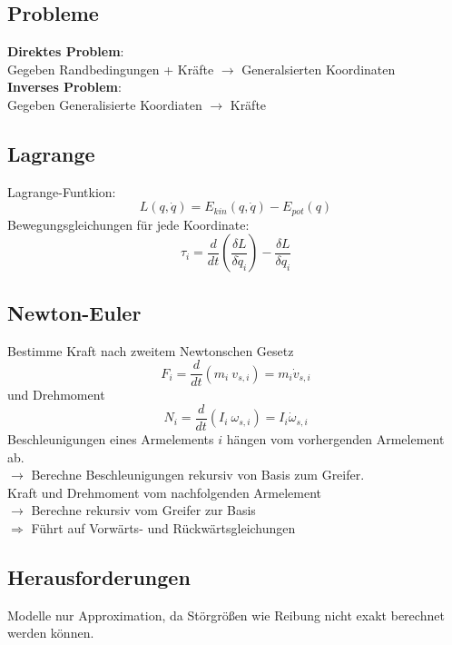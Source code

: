 \subsection{Probleme}
\textbf{Direktes Problem}:\\
Gegeben Randbedingungen + Kräfte \(\rightarrow\) Generalsierten Koordinaten\\

\textbf{Inverses Problem}:\\
Gegeben Generalisierte Koordiaten \(\rightarrow\) Kräfte


\subsection{Lagrange}
Lagrange-Funtkion:
\[ L(q, \dot{q}) = E_{\mathit{kin}}(q, \dot{q}) - E_{\mathit{pot}}(q) \]
Bewegungsgleichungen für jede Koordinate:
\[\tau_i = \frac{d}{dt} \left(\frac{\delta L}{\delta \dot{q}_i}\right) - \frac{\delta L}{\delta q_i}\]

\subsection{Newton-Euler}
Bestimme Kraft nach zweitem Newtonschen Gesetz
\[F_i = \frac{d}{dt} (m_i\ v_{s,i}) = m_i \dot{v}_{s,i}\]
und Drehmoment
\[N_i = \frac{d}{dt}(I_i\ \omega_{s,i}) = I_i \dot{\omega}_{s, i}\]
Beschleunigungen eines Armelements \(i\) hängen vom vorhergenden Armelement ab.\\
\(\rightarrow\) Berechne Beschleunigungen rekursiv von Basis zum Greifer.\\
Kraft und Drehmoment vom nachfolgenden Armelement\\
\(\rightarrow\) Berechne rekursiv vom Greifer zur Basis\\

\(\Rightarrow\) Führt auf Vorwärts- und Rückwärtsgleichungen


\subsection{Herausforderungen}
Modelle nur Approximation, da Störgrößen wie Reibung nicht exakt berechnet werden können.